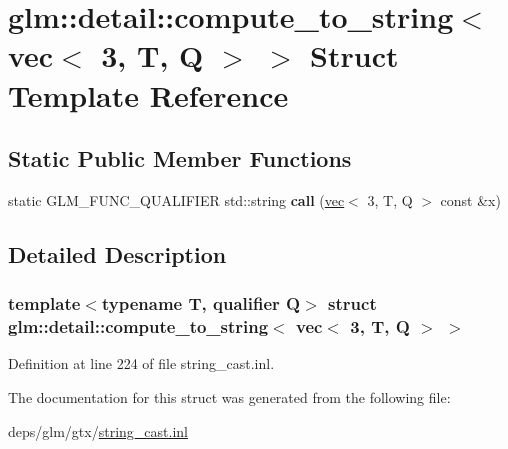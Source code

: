 \hypertarget{structglm_1_1detail_1_1compute__to__string_3_01vec_3_013_00_01T_00_01Q_01_4_01_4}{}\section{glm\+:\+:detail\+:\+:compute\+\_\+to\+\_\+string$<$ vec$<$ 3, T, Q $>$ $>$ Struct Template Reference}
\label{structglm_1_1detail_1_1compute__to__string_3_01vec_3_013_00_01T_00_01Q_01_4_01_4}
\subsection*{Static Public Member Functions}
\begin{DoxyCompactItemize}
\item 
\mbox{\label{structglm_1_1detail_1_1compute__to__string_3_01vec_3_013_00_01T_00_01Q_01_4_01_4_a61d57060d3b0c3f2dd672f7b8cf962a5}} 
static G\+L\+M\+\_\+\+F\+U\+N\+C\+\_\+\+Q\+U\+A\+L\+I\+F\+I\+ER std\+::string {\bfseries call} (\hyperlink{structglm_1_1vec}{vec}$<$ 3, T, Q $>$ const \&x)
\end{DoxyCompactItemize}


\subsection{Detailed Description}
\subsubsection*{template$<$typename T, qualifier Q$>$\newline
struct glm\+::detail\+::compute\+\_\+to\+\_\+string$<$ vec$<$ 3, T, Q $>$ $>$}



Definition at line 224 of file string\+\_\+cast.\+inl.



The documentation for this struct was generated from the following file\+:\begin{DoxyCompactItemize}
\item 
deps/glm/gtx/\hyperlink{string__cast_8inl}{string\+\_\+cast.\+inl}\end{DoxyCompactItemize}

